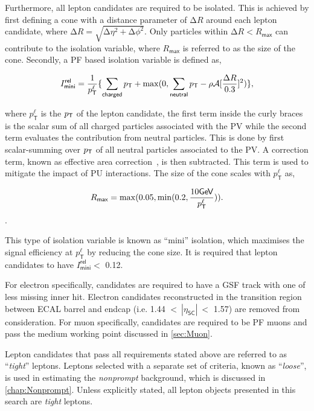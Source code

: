 Furthermore, all lepton candidates are required to be isolated. This is achieved by first defining a cone with a distance parameter of $\mathrm{\Delta}R$ around each lepton candidate, where $\mathrm{\Delta}R=\sqrt{\mathrm{\Delta}\eta^2+\mathrm{\Delta}\phi^2}$. Only particles within $\mathrm{\Delta}R<R_{\textsf{max}}$ can contribute to the isolation variable, where $R_{\textsf{max}}$ is referred to as the size of the cone. Secondly, a \ac{PF} based isolation variable is defined as,

\begin{equation}
I^{\textsf{rel}}_{\textsf{mini}} = \frac{1}{p_{\textsf{T}}^{\ell}} \{\sum_{\textsf{charged}}p_{\textsf{T}}+\max(0,\sum_{\textsf{neutral}}p_{\textsf{T}}-\rho \mathcal{A}[\frac{\mathrm{\Delta}R}{0.3}]^2)\},
\end{equation}

where $p_{\textsf{T}}^{\ell}$ is the $p_{\textsf{T}}$ of the lepton candidate, the first term inside the curly braces is the scalar sum of all charged particles associated with the \ac{PV} while the second term evaluates the contribution from neutral particles. This is done by first scalar-summing over $p_{\textsf{T}}$ of all neutral particles associated to the \ac{PV}. A correction term, known as effective area correction~\cite{Cacciari:2007fd}, is then subtracted. This term is used to mitigate the impact of \ac{PU} interactions. The size of the cone scales with $p_{\textsf{T}}^{\ell}$ as,  

\begin{equation}
R_{\textsf{max}} = \max (0.05, \min(0.2, \frac{10\textsf{GeV}}{p_{\textsf{T}}^{\ell}})).
\end{equation}.

This type of isolation variable is known as ``mini'' isolation, which maximises the signal efficiency at $p_{\textsf{T}}^{\ell}$ by reducing the cone size. It is required that lepton candidates to have $I^{\textsf{rel}}_{\textsf{mini}}<$ 0.12.

For electron specifically, candidates are required to have a GSF track with one of less missing inner hit. Electron candidates reconstructed in the transition region between ECAL barrel and endcap (i.e. 1.44 $<~|\eta_{\textsf{SC}}|~<$ 1.57) are removed from consideration. For muon specifically, candidates are required to be \ac{PF} muons and pass the medium working point discussed in \autoref{sec:Muon}.

Lepton candidates that pass all requirements stated above are referred to as ``\emph{tight}'' leptons. Leptons selected with a separate set of criteria, known as ``\emph{loose}'', is used in estimating the \emph{nonprompt} background, which is discussed in \autoref{chap:Nonprompt}. Unless explicitly stated, all lepton objects presented in this search are \emph{tight} leptons.

